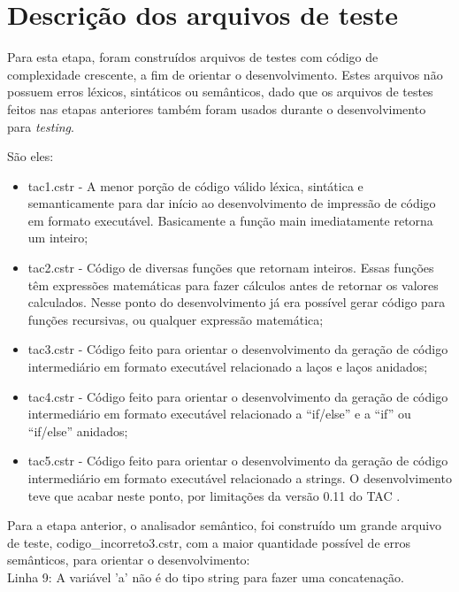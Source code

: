 \documentclass[12pt]{article}
\begin{document}
\section{Descrição dos arquivos de teste}

\indent

Para esta etapa, foram construídos arquivos de testes com código de complexidade crescente, a fim de orientar o desenvolvimento. Estes arquivos não possuem erros léxicos, sintáticos ou semânticos, dado que os arquivos de testes feitos nas etapas anteriores também foram usados durante o desenvolvimento para \textit{testing}.

São eles:

\begin{itemize}
	\item tac1.cstr - A menor porção de código válido léxica, sintática e semanticamente para dar início ao desenvolvimento de impressão de código em formato executável. Basicamente a função main imediatamente retorna um inteiro;
	\item tac2.cstr - Código de diversas funções que retornam inteiros. Essas funções têm expressões matemáticas para fazer cálculos antes de retornar os valores calculados. Nesse ponto do desenvolvimento já era possível gerar código para funções recursivas, ou qualquer expressão matemática;
	\item tac3.cstr - Código feito para orientar o desenvolvimento da geração de código intermediário em formato executável relacionado a laços e laços anidados;
	\item tac4.cstr - Código feito para orientar o desenvolvimento da geração de código intermediário em formato executável relacionado a ``if/else'' e a ``if'' ou ``if/else'' anidados;
	\item tac5.cstr - Código feito para orientar o desenvolvimento da geração de código intermediário em formato executável relacionado a strings. O desenvolvimento teve que acabar neste ponto, por limitações da versão 0.11 do TAC \cite{tac2014}.\\
\end{itemize}


Para a etapa anterior, o analisador semântico, foi construído um grande arquivo de teste, codigo\_incorreto3.cstr, com a maior quantidade possível de erros semânticos, para orientar o desenvolvimento:\\

Linha 9: A variável 'a' não é do tipo string para fazer uma concatenação.
\end{document}

